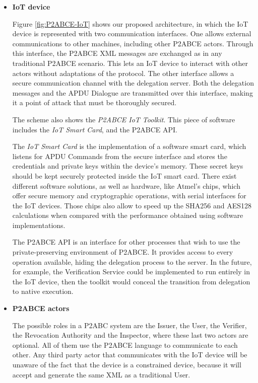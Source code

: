 \begin{itemize}
	
	\item \textbf{IoT device}
	
	Figure \ref{fig:P2ABCE-IoT} shows our proposed architecture, in which the IoT device is represented with two communication interfaces. One allows external communications to other machines, including other P2ABCE actors. Through this interface, the P2ABCE XML messages are exchanged as in any traditional P2ABCE scenario. This lets an IoT device to interact with other actors without adaptations of the protocol. The other interface allows a secure communication channel with the delegation server. Both the delegation messages and the APDU Dialogue are transmitted over this interface, making it a point of attack that must be thoroughly secured.
	
	The scheme also shows the \textit{P2ABCE IoT Toolkit}. This piece of software includes the \textit{IoT Smart Card}, and the P2ABCE API.
	
	The \textit{IoT Smart Card} is the implementation of a software smart card, which listens for APDU Commands from the secure interface and stores the credentials and private keys within the device's memory. 
	These secret keys should be kept securely protected inside the IoT smart card. There exist different software solutions, as well as hardware, like Atmel's chips, which offer secure memory and cryptographic operations, with serial interfaces for the IoT devices. Those chips also allow to speed up the SHA256 and AES128 calculations when compared with the performance obtained using software implementations.
	
	The P2ABCE API is an interface for other processes that wish to use the private-preserving environment of P2ABCE. It provides access to every operation available, hiding the delegation process to the server. In the future, for example, the Verification Service could be implemented to run entirely in the IoT device, then the toolkit would conceal the transition from delegation to native execution.
	
	
	\item \textbf{P2ABCE actors}
	
	The possible roles in a P2ABC system are the Issuer, the User, the Verifier, the Revocation Authority and the Inspector, where these last two actors are optional. All of them use the P2ABCE language to communicate to each other. Any third party actor that communicates with the IoT device will be unaware of the fact that the device is a constrained device, because it will accept and generate the same XML as a traditional User.
	

\end{itemize}
